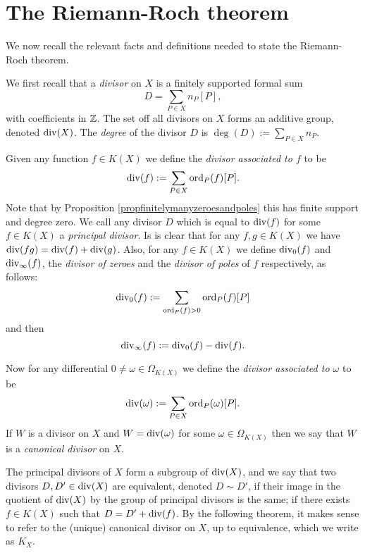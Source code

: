 \section{The Riemann-Roch theorem}

We now recall the relevant facts and definitions needed to state the Riemann-Roch theorem.

We first recall that a \emph{divisor} on $X$ is a finitely supported formal sum 
    \[
    D = \sum_{P \in X} n_P[P],
    \]
with coefficients in ${\mathbb Z}$.
The set off all divisors on $X$ forms an additive group, denoted $\operatorname{div} (X)$.
The \emph{degree} of the divisor $D$ is $\deg(D) := \sum_{P \in X} n_P$.


Given any function $f \in K(X)$ we define the \emph{divisor associated to $f$} to be
    \[
    \operatorname{div}(f) := \sum_{P \in X} \operatorname{ord}_P(f) [P].
    \]
Note that by Proposition \ref{propfinitelymanyzeroesandpoles} this has finite support and degree zero.
We call any divisor $D$ which is equal to $\operatorname{div}(f)$ for some $f \in K(X)$ a \emph{principal divisor}.
Is is clear that for any $f, g \in K(X)$ we have $\operatorname{div}(fg) = \operatorname{div}(f) + \operatorname{div}(g)$.
Also, for any $f \in K(X)$ we define $\operatorname{div}_0(f)$ and $\operatorname{div}_\infty (f)$, the \emph{divisor of zeroes} and the \emph{divisor of poles} of $f$ respectively, as follows:
    \[
    \operatorname{div}_0(f) := \sum_{\operatorname{ord}_P(f) >0} \operatorname{ord}_P(f)[P]
    \]
and then
    \[
    \operatorname{div}_\infty(f) := \operatorname{div}_0(f) - \operatorname{div}(f).
    \]

Now for any differential $0 \neq \omega \in \Omega_{K(X)}$ we define the \emph{divisor associated to $\omega$} to be
    \[
    \operatorname{div}(\omega) := \sum_{P \in X} \operatorname{ord}_P(\omega)[P].
    \]
If $W$ is a divisor on $X$ and $W = \operatorname{div}(\omega)$ for some $ \omega \in \Omega_{K(X)}$ then we say that $W$ is a \emph{canonical divisor} on $X$.

The principal divisors of $X$ form a subgroup of $\operatorname{div}(X)$, and we say that two divisors $D, D' \in \operatorname{div}(X)$ are equivalent, denoted $D \sim D'$, if their image in the quotient of $\operatorname{div}(X)$ by the group of principal divisors is the same; \ie if there exists $f \in K(X)$ such that $ D = D' + \operatorname{div}(f)$.
By the following theorem, it makes sense to refer to the (unique) canonical divisor on $X$, up to equivalence, which we write as $K_X$.


